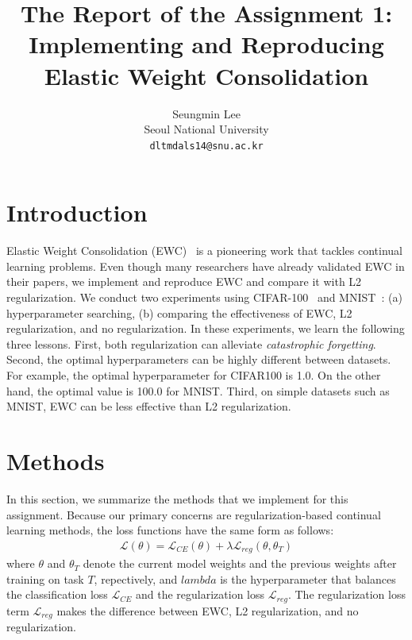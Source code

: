 \documentclass[final]{cvpr}
\begin{document}
\title{The Report of the Assignment 1:\\Implementing and Reproducing Elastic Weight Consolidation}

\author{Seungmin Lee\\
Seoul National University\\
{\tt\small dltmdals14@snu.ac.kr}
}

\onecolumn
\maketitle


\section{Introduction}
Elastic Weight Consolidation (EWC)~\cite{ewc} is a pioneering work that tackles continual learning problems. Even though many researchers have already validated EWC in their papers, we implement and reproduce EWC and compare it with L2 regularization. We conduct two experiments using CIFAR-100~\cite{cifar} and MNIST~\cite{mnist}: (a) hyperparameter searching, (b) comparing the effectiveness of EWC, L2 regularization, and no regularization. In these experiments, we learn the following three lessons. First, both regularization can alleviate \textit{catastrophic forgetting}. Second, the optimal hyperparameters can be highly different between datasets. For example, the optimal hyperparameter for CIFAR100 is 1.0. On the other hand, the optimal value is 100.0 for MNIST. Third, on simple datasets such as MNIST, EWC can be less effective than L2 regularization. 

\section{Methods}\label{method}
In this section, we summarize the methods that we implement for this assignment. Because our primary concerns are regularization-based continual learning methods, the loss functions have the same form as follows:
\begin{align}
	\mathcal{L}(\theta) = \mathcal{L}_{CE}(\theta) + \lambda\mathcal{L}_{reg}(\theta, \theta_T)
\end{align}
where $\theta$ and $\theta_T$ denote the current model weights and the previous weights after training on task $T$, repectively, and $lambda$ is the hyperparameter that balances the classification loss $\mathcal{L}_{CE}$ and the regularization loss $\mathcal{L}_{reg}$. The regularization loss term $\mathcal{L}_{reg}$ makes the difference between EWC, L2 regularization, and no regularization.
\end{document}

